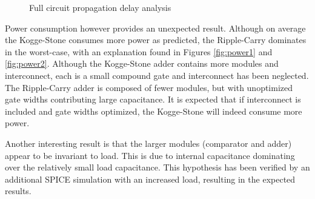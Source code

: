 \documentclass[conference]{IEEEtran}
\begin{document}
\FloatBarrier
\begin{figure}[h]
\centering
{}
\caption{Full circuit propagation delay analysis}
\label{fig:delay4}
\end{figure}
\FloatBarrier

Power consumption however provides an unexpected result. Although on average the Kogge-Stone consumes more power as predicted, the Ripple-Carry dominates in the worst-case, with an explanation found in Figures \ref{fig:power1} and \ref{fig:power2}. Although the Kogge-Stone adder contains more modules and interconnect, each is a small compound gate and interconnect has been neglected. The Ripple-Carry adder is composed of fewer modules, but with unoptimized gate widths contributing large capacitance. It is expected that if interconnect is included and gate widths optimized, the Kogge-Stone will indeed consume more power.

Another interesting result is that the larger modules (comparator and adder) appear to be invariant to load. This is due to internal capacitance dominating over the relatively small load capacitance. This hypothesis has been verified by an additional SPICE simulation with an increased load, resulting in the expected results.
\end{document}
